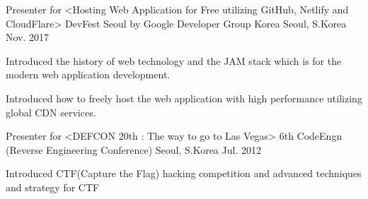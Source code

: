 

\begin{cventries}

  \cventry
    {Presenter for <Hosting Web Application for Free utilizing GitHub, Netlify and CloudFlare>} %
    {DevFest Seoul by Google Developer Group Korea} %
    {Seoul, S.Korea} %
    {Nov. 2017} %
    {
      \begin{cvitems} %
        \item {Introduced the history of web technology and the JAM stack which is for the modern web application development.}
        \item {Introduced how to freely host the web application with high performance utilizing global CDN services.}
      \end{cvitems}
    }

\entryskip
  \cventry
    {Presenter for <DEFCON 20th : The way to go to Las Vegas>} %
    {6th CodeEngn (Reverse Engineering Conference)} %
    {Seoul, S.Korea} %
    {Jul. 2012} %
    {
      \begin{cvitems} %
        \item {Introduced CTF(Capture the Flag) hacking competition and advanced techniques and strategy for CTF}
      \end{cvitems}
    }

\end{cventries}
